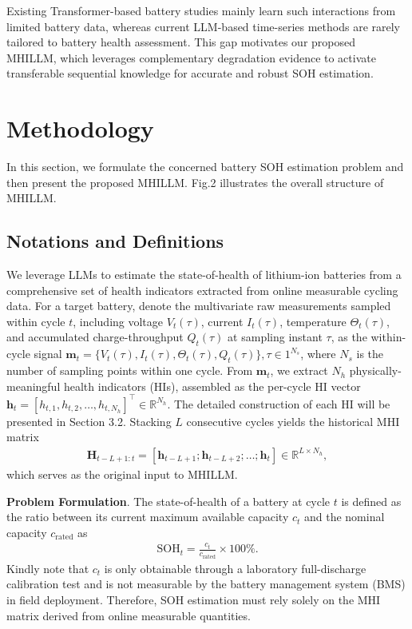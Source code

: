 \documentclass[preprint,12pt]{elsarticle}
\begin{document}
Existing Transformer-based battery studies mainly learn such interactions from limited battery data, whereas current LLM-based time-series methods are rarely tailored to battery health assessment. This gap motivates our proposed MHILLM, which leverages complementary degradation evidence to activate transferable sequential knowledge for accurate and robust SOH estimation.

  
\section{Methodology}  
In this section, we formulate the concerned battery SOH estimation problem and then present the proposed MHILLM. Fig.2 illustrates the overall structure of MHILLM.



\subsection{Notations and Definitions}
We leverage LLMs to estimate the state-of-health of lithium-ion batteries from a comprehensive set of health indicators extracted from online measurable cycling data. For a target battery, denote the multivariate raw measurements sampled within cycle $t$, including voltage $V_t(\tau)$, current $I_t(\tau)$, temperature $\Theta_t(\tau)$, and accumulated charge-throughput $Q_t(\tau)$ at sampling instant $\tau$, as the within-cycle signal $\mathbf{m}_t = \{V_t(\tau), I_t(\tau), \Theta_t(\tau), Q_t(\tau)\}, {\tau \in 1}^{N_s}$, where $N_s$ is the number of sampling points within one cycle. From $\mathbf{m}_t$, we extract $N_h$ physically-meaningful health indicators (HIs), assembled as the per-cycle HI vector $\mathbf{h}_t = [h_{t,1}, h_{t,2}, \ldots, h_{t,N_h}]^{\top} \in \mathbb{R}^{N_h}$. The detailed construction of each HI will be presented in Section 3.2. Stacking $L$ consecutive cycles yields the historical MHI matrix
\begin{gather}
\mathbf{H}_{t-L+1:t} = [\mathbf{h}_{t-L+1}; \mathbf{h}_{t-L+2}; \ldots; \mathbf{h}_{t}] \in \mathbb{R}^{L \times N_h},
\end{gather}
which serves as the original input to MHILLM.


\textbf{Problem Formulation}.
The state-of-health of a battery at cycle $t$ is defined as the ratio between its current maximum available capacity $c_t$ and the nominal capacity $c_{\text{rated}}$ as
\begin{gather}
\text{SOH}_t = \frac{c_t}{c_{\text{rated}}} \times 100 \%.
\end{gather}
Kindly note that $c_t$ is only obtainable through a laboratory full-discharge calibration test and is not measurable by the battery management system (BMS) in field deployment. Therefore, SOH estimation must rely solely on the MHI matrix derived from online measurable quantities. 
\end{document}

